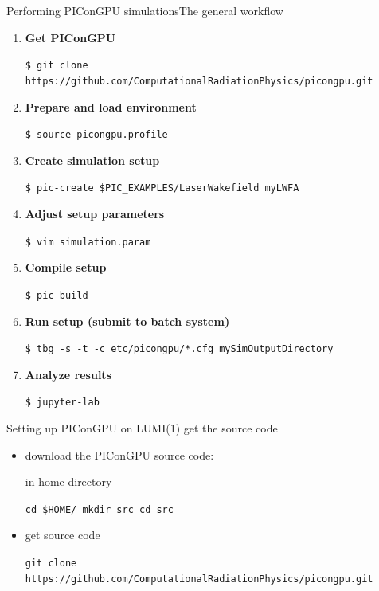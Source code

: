 \documentclass[
  aspectratio=169,
  10pt
]{beamer}
\newcommand{\terminal}[1]{\par\noindent\colorbox{shadecolor}
{\parbox{\dimexpr\textwidth-2\fboxsep\relax}{\texttt{#1}}}}
\begin{document}
\begin{frame}[t,fragile]{Performing PIConGPU simulations}{The general workflow}
\begin{enumerate}
    \item \textbf{Get PIConGPU }\\
        \terminal{\$ git clone  https://github.com/ComputationalRadiationPhysics/picongpu.git}
    \item \textbf{Prepare and load environment}\\
        \terminal{\$ source picongpu.profile}
    \item \textbf{Create simulation setup}\\
        \terminal{\$ pic-create \$PIC\_EXAMPLES/LaserWakefield myLWFA}
    \item \textbf{Adjust setup parameters}\\
        \terminal{\$ vim simulation.param}
    \item \textbf{Compile setup}\\
        \terminal{\$ pic-build}
    \item \textbf{Run setup (submit to batch system)}\\
        \terminal{\$ tbg -s -t -c etc/picongpu/*.cfg mySimOutputDirectory}
    \item \textbf{Analyze results}\\
        \terminal{\$ jupyter-lab}
\end{enumerate}
\end{frame}




\begin{frame}[t,fragile]{Setting up PIConGPU on LUMI}{(1) get the source code}

\begin{itemize}
    \item download the PIConGPU source code:
    \begin{itemize}
        in home directory
        \terminal{cd \$HOME/ \newline
        mkdir src \newline
        cd src}
    \end{itemize}
    \item get source code
    \terminal{git clone https://github.com/ComputationalRadiationPhysics/picongpu.git}
\end{itemize}

\end{frame}
\end{document}
